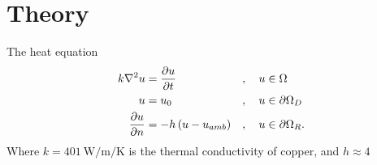 \section{Theory}
The heat equation
\begin{alignat}{3}
	k\laplacian{u} &= \pdv{u}{t} &&,\quad u \in \Omega \\
	u &= u_0 &&,\quad u \in \partial\Omega_D \\
	\pdv{u}{n} &= -h\left(u - u_{amb} \right) &&, \quad u \in \partial\Omega_R.
\end{alignat}
Where $k = \SI{401}{\watt\per\meter\per\kelvin}$ is the thermal conductivity of copper, and $h \approx 4$